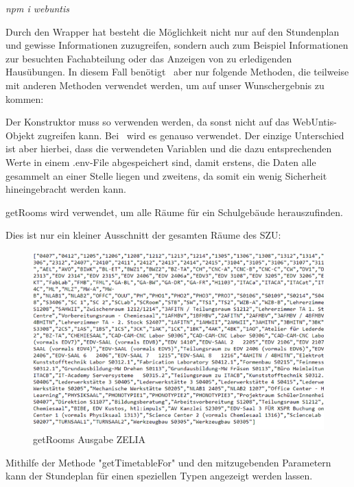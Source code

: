 \emph{npm i webuntis}

Durch den Wrapper hat besteht die Möglichkeit nicht nur auf den Stundenplan und gewisse Informationen zuzugreifen, sondern auch zum Beispiel Informationen zur besuchten Fachabteilung oder das Anzeigen von zu erledigenden Hausübungen. In diesem Fall benötigt \ZELIA\ aber nur folgende Methoden, die teilweise mit anderen Methoden verwendet werden, um auf unser Wunschergebnis zu kommen:



Der Konstruktor muss so verwenden werden, da sonst nicht auf das WebUntis-Objekt zugreifen kann. Bei \ZELIA\ wird es genauso verwendet. Der einzige Unterschied ist aber hierbei, dass die verwendeten Variablen und die dazu entsprechenden Werte in einem .env-File abgespeichert sind, damit erstens, die Daten alle gesammelt an einer Stelle liegen und zweitens, da somit ein wenig Sicherheit hineingebracht werden kann.


getRooms wird verwendet, um alle Räume für ein Schulgebäude herauszufinden.


Dies ist nur ein kleiner Ausschnitt der gesamten Räume des SZU:

\begin{figure}[H]
    \centering
    \includegraphics{media/WebUntis/getRoomsAusgabe.png}
    \caption{getRooms Ausgabe ZELIA}
\end{figure}

Mithilfe der Methode "getTimetableFor" und den mitzugebenden Parametern kann der Stundeplan für einen speziellen Typen angezeigt werden lassen.

